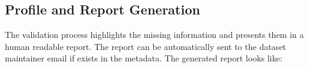 \documentclass[runningheads,a4paper]{llncs}
\begin{document}




\subsection{Profile and Report Generation}

The validation process highlights the missing information and presents them in a human readable report. The report can be automatically sent to the dataset maintainer email if exists in the metadata. The generated report looks like:
\end{document}

